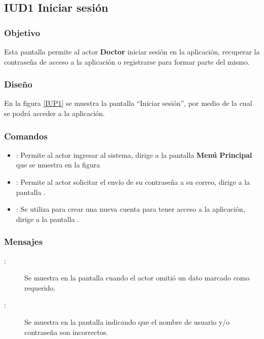 \subsection{IUD1 Iniciar sesión}
 
\subsubsection{Objetivo}

    Esta pantalla permite al actor \textbf{Doctor} iniciar sesión en la aplicación, recuperar la contraseña de acceso a la aplicación o registrarse para formar parte del mismo.

\subsubsection{Diseño}

    En la figura \ref{IUP1} se muestra la pantalla ``Iniciar sesión'', por medio de la cual se podrá acceder a la aplicación. \\


\subsubsection{Comandos}
\begin{itemize}
    \item {}: Permite al actor ingresar al sistema, dirige a la pantalla \textbf{Menú Principal} que se muestra en la figura %
    \item {}: Permite al actor solicitar el envío de su contraseña a su correo, dirige a la pantalla .
    \item {}: Se utiliza para crear una nueva cuenta para tener acceso a la aplicación, dirige a la pantalla .
\end{itemize}

\subsubsection{Mensajes}

\begin{description}
    \item[:] Se muestra en la pantalla  cuando el actor omitió un dato marcado como requerido.
    \item[:] Se muestra en la pantalla  indicando que el nombre de usuario y/o contraseña son incorrectos.
\end{description}
